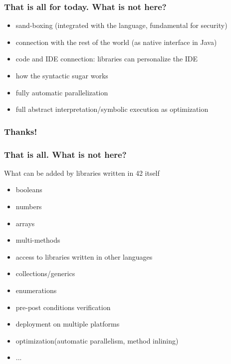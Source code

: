 \begin{frame}[fragile]
\frametitle{That is all for today. What is \textbf{not} here?}

\begin{itemize}
\item sand-boxing  (integrated with the language, fundamental for security)
\item connection with the rest of the world (as native interface in Java)
\item code and IDE connection: libraries can personalize the IDE
\item how the syntactic sugar works
\item fully automatic parallelization
\item full abstract interpretation/symbolic execution as optimization
\end{itemize}

\end{frame}

\begin{frame}[fragile]
\frametitle{ Thanks! }
\end{frame}

\begin{frame}[fragile]
\addtocounter{framenumber}{-1}
\frametitle{That is all. What is \textbf{not} here?}

What can be added by libraries written in 42 itself
\begin{itemize}
\item booleans
\item numbers
\item arrays
\item multi-methods
\item access to libraries written in other languages
\item collections/generics
\item enumerations
\item pre-post conditions verification
\item deployment on multiple platforms
\item optimization(automatic parallelism, method inlining)
\item ...
\end{itemize}
\end{frame}




